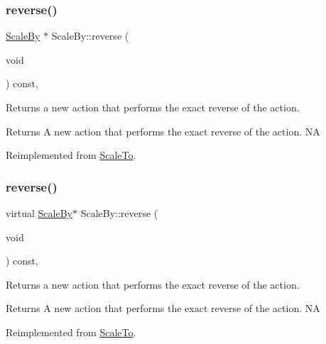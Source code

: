 \subsubsection{\texorpdfstring{reverse()}{reverse()}\hspace{0.1cm}{\footnotesize\ttfamily [1/2]}}
{\footnotesize\ttfamily \hyperlink{classScaleBy}{Scale\+By} $\ast$ Scale\+By\+::reverse (\begin{DoxyParamCaption}\item[{void}]{ }\end{DoxyParamCaption}) const\hspace{0.3cm}{\ttfamily [override]}, {\ttfamily [virtual]}}

Returns a new action that performs the exact reverse of the action.

\begin{DoxyReturn}{Returns}
A new action that performs the exact reverse of the action.  NA 
\end{DoxyReturn}


Reimplemented from \hyperlink{classScaleTo_a511d41e9e8a8b2ad3a751bb455912c03}{Scale\+To}.

\mbox{\label{classScaleBy_af4eaed672c6ed4991594d6404c49c521}} 
\subsubsection{\texorpdfstring{reverse()}{reverse()}\hspace{0.1cm}{\footnotesize\ttfamily [2/2]}}
{\footnotesize\ttfamily virtual \hyperlink{classScaleBy}{Scale\+By}$\ast$ Scale\+By\+::reverse (\begin{DoxyParamCaption}\item[{void}]{ }\end{DoxyParamCaption}) const\hspace{0.3cm}{\ttfamily [override]}, {\ttfamily [virtual]}}

Returns a new action that performs the exact reverse of the action.

\begin{DoxyReturn}{Returns}
A new action that performs the exact reverse of the action.  NA 
\end{DoxyReturn}


Reimplemented from \hyperlink{classScaleTo_a511d41e9e8a8b2ad3a751bb455912c03}{Scale\+To}.

